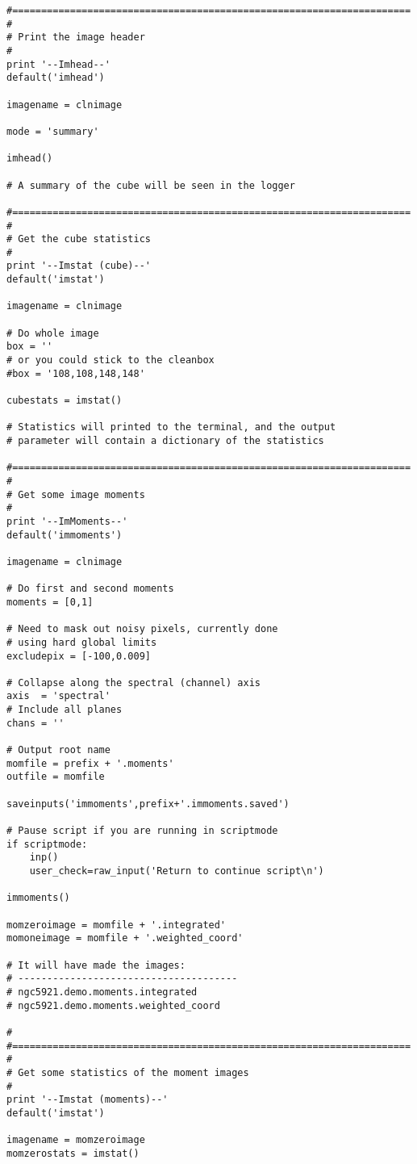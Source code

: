 \begin{verbatim}
#=====================================================================
#
# Print the image header
#
print '--Imhead--'
default('imhead')

imagename = clnimage

mode = 'summary'

imhead()

# A summary of the cube will be seen in the logger

#=====================================================================
#
# Get the cube statistics
#
print '--Imstat (cube)--'
default('imstat')

imagename = clnimage

# Do whole image
box = ''
# or you could stick to the cleanbox
#box = '108,108,148,148'

cubestats = imstat()

# Statistics will printed to the terminal, and the output 
# parameter will contain a dictionary of the statistics

#=====================================================================
#
# Get some image moments
#
print '--ImMoments--'
default('immoments')

imagename = clnimage

# Do first and second moments
moments = [0,1]

# Need to mask out noisy pixels, currently done
# using hard global limits
excludepix = [-100,0.009]

# Collapse along the spectral (channel) axis
axis  = 'spectral'
# Include all planes
chans = ''

# Output root name
momfile = prefix + '.moments'
outfile = momfile

saveinputs('immoments',prefix+'.immoments.saved')

# Pause script if you are running in scriptmode
if scriptmode:
    inp()
    user_check=raw_input('Return to continue script\n')

immoments()

momzeroimage = momfile + '.integrated'
momoneimage = momfile + '.weighted_coord'

# It will have made the images:
# --------------------------------------
# ngc5921.demo.moments.integrated
# ngc5921.demo.moments.weighted_coord

#
#=====================================================================
#
# Get some statistics of the moment images
#
print '--Imstat (moments)--'
default('imstat')

imagename = momzeroimage
momzerostats = imstat()


\end{verbatim}

